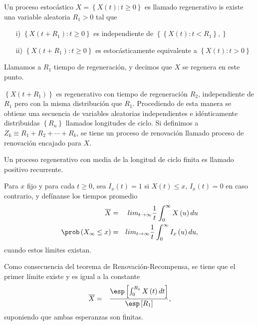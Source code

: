 \begin{Def}
Un proceso estoc\'astico $X=\left\{X\left(t\right):t\geq0\right\}$ es llamado regenerativo is existe una variable aleatoria $R_{1}>0$ tal que
\begin{itemize}
\item[i)] $\left\{X\left(t+R_{1}\right):t\geq0\right\}$ es independiente de $\left\{\left\{X\left(t\right):t<R_{1}\right\},\right\}$
\item[ii)] $\left\{X\left(t+R_{1}\right):t\geq0\right\}$ es estoc\'asticamente equivalente a $\left\{X\left(t\right):t>0\right\}$
\end{itemize}

Llamamos a $R_{1}$ tiempo de regeneraci\'on, y decimos que $X$ se regenera en este punto.
\end{Def}

$\left\{X\left(t+R_{1}\right)\right\}$ es regenerativo con tiempo de regeneraci\'on $R_{2}$, independiente de $R_{1}$ pero con la misma distribuci\'on que $R_{1}$. Procediendo de esta manera se obtiene una secuencia de variables aleatorias independientes e id\'enticamente distribuidas $\left\{R_{n}\right\}$ llamados longitudes de ciclo. Si definimos a $Z_{k}\equiv R_{1}+R_{2}+\cdots+R_{k}$, se tiene un proceso de renovaci\'on llamado proceso de renovaci\'on encajado para $X$.

\begin{Note}
Un proceso regenerativo con media de la longitud de ciclo finita es llamado positivo recurrente.
\end{Note}


\begin{Def}
Para $x$ fijo y para cada $t\geq0$, sea $I_{x}\left(t\right)=1$ si $X\left(t\right)\leq x$,  $I_{x}\left(t\right)=0$ en caso contrario, y def\'inanse los tiempos promedio
\begin{eqnarray*}
\overline{X}&=&lim_{t\rightarrow\infty}\frac{1}{t}\int_{0}^{\infty}X\left(u\right)du\\
\prob\left(X_{\infty}\leq x\right)&=&lim_{t\rightarrow\infty}\frac{1}{t}\int_{0}^{\infty}I_{x}\left(u\right)du,
\end{eqnarray*}
cuando estos l\'imites existan.
\end{Def}

Como consecuencia del teorema de Renovaci\'on-Recompensa, se tiene que el primer l\'imite  existe y es igual a la constante
\begin{eqnarray*}
\overline{X}&=&\frac{\esp\left[\int_{0}^{R_{1}}X\left(t\right)dt\right]}{\esp\left[R_{1}\right]},
\end{eqnarray*}
suponiendo que ambas esperanzas son finitas.

